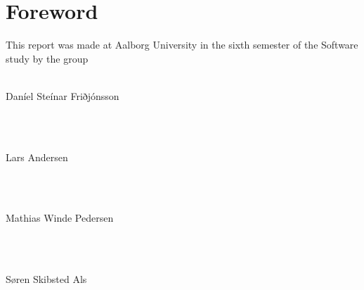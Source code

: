 \chapter*{Foreword}
\noindent This report was made at Aalborg University in the sixth semester of the Software study by the group \\ \\



\noindent
\vspace{5mm}
\parbox[h]{4cm}{Daníel Steínar Friðjónsson}\hspace{0.5cm} \makebox[7cm]{\hrulefill} \\ \\
\vspace{5mm}
\parbox[h]{4cm}{Lars Andersen}\hspace{0.5cm} \makebox[7cm]{\hrulefill} \\ \\
\vspace{5mm}
\parbox[h]{4cm}{Mathias Winde Pedersen}\hspace{0.5cm} \makebox[7cm]{\hrulefill} \\ \\
\vspace{5mm}
\parbox[h]{4cm}{S\o ren Skibsted Als}\hspace{0.5cm} \makebox[7cm]{\hrulefill} \\ \\
\newpage
